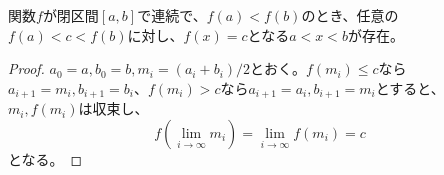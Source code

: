 	\begin{thm}[中間値の定理]
		関数$f$が閉区間$[a, b]$で連続で、$f(a) < f(b)$のとき、任意の$f(a) < c < f(b)$に対し、$f(x) = c$となる$a < x < b$が存在。
	\end{thm}
	\begin{proof}
		$a_0 = a, b_0 = b, m_i = (a_i + b_i)/2$とおく。$f(m_i) \leq c$なら$a_{i+1} = m_i, b_{i+1} = b_i$、$f(m_i) > c$なら$a_{i+1} = a_i, b_{i+1} = m_i$とすると、$m_i, f(m_i)$は収束し、
			\[f(\lim_{i \to \infty} m_i) = \lim_{i \to \infty} f(m_i) = c\]
		となる。
	\end{proof}